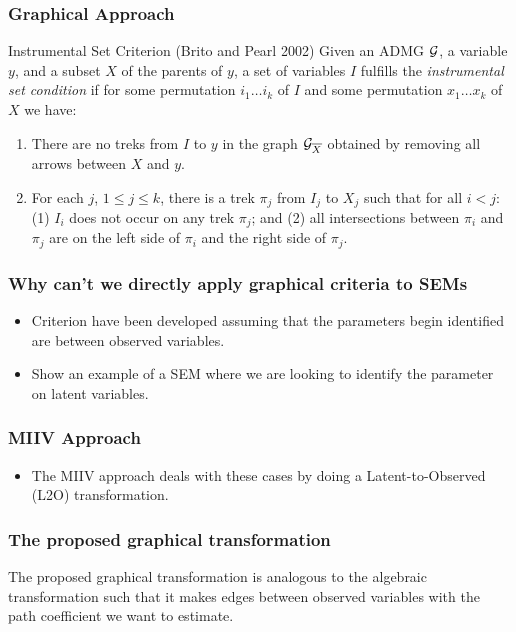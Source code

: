 \documentclass{beamer}
\begin{document}
\begin{frame}
	\frametitle{Graphical Approach}
	\begin{block}{Instrumental Set Criterion (Brito and Pearl 2002)}
Given an ADMG $\cal
	G$, a variable $y$, and a subset $X$ of the parents of $y$, 
	a set of variables
	$I$ fulfills the 
	\emph{instrumental set condition}
	if for {some} permutation $ i_1 \ldots i_k $ of
	$ I $ and {some} permutation
	$ x_1 \ldots x_k $ of $ X $ we have: 
	\begin{enumerate}
		\item There are no treks from $I$ to $y$ in the graph ${\cal
			G}_{\overline{X}}$ obtained by removing all arrows 
			between $X$ and $y$. 
		\item For each $j$, $1 \leq j \leq k$, there is a trek $\pi_j$ from
			$I_j$ to $X_j$ such that for all $i < j$: (1) $I_i$ does not
			occur on any trek $\pi_j$; and (2) all intersections between
			$\pi_i$ and $\pi_j$ are on the left side of $\pi_i$ and the
			right side of $\pi_j$.
	\end{enumerate}
	\end{block}
\end{frame}

\begin{frame}
	\frametitle{Why can't we directly apply graphical criteria to SEMs}
	\begin{itemize}
		\item Criterion have been developed assuming that the parameters 
			begin identified are between observed variables.
		\item Show an example of a SEM where we are looking to identify 
			the parameter on latent variables.
	\end{itemize}
\end{frame}

\begin{frame}
	\frametitle{MIIV Approach}
	\begin{itemize}
		\item The MIIV approach deals with these cases by doing a
			Latent-to-Observed (L2O) transformation.
	\end{itemize}
\end{frame}

\begin{frame}
	\frametitle{The proposed graphical transformation}
	The proposed graphical transformation is analogous to the algebraic 
	transformation such that it makes edges between observed variables
	with the path coefficient we want to estimate.
\end{frame}
\end{document}

